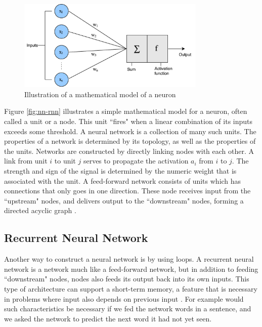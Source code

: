\begin{figure}[ht]
    \centering
    \includegraphics[width=0.8\textwidth]{fig/related_work/nn_perceptron.pdf}
    \caption{Illustration of a mathematical model of a neuron}
    \label{fig:nn-perceptron}
\end{figure}

Figure \ref{fig:nn-rnn} illustrates a simple mathematical model for a neuron, often called a unit or a node. This unit ``fires" when a linear combination of its inputs exceeds some threshold. A neural network is a collection of many such units. The properties of a network is determined by its topology, as well as the properties of the units. Networks are constructed by directly linking nodes with each other. A link from unit \(i\) to unit \(j\) serves to propagate the activation \(a_{i}\) from \(i\) to \(j\). The strength and sign of the signal is determined by the numeric weight that is associated with the unit. A feed-forward network consists of units which has connections that only goes in one direction. These node receives input from the ``upstream" nodes, and delivers output to the ``downstream" nodes, forming a directed acyclic graph \citep{russell2010aimodernapproach}.

\subsection{Recurrent Neural Network}
Another way to construct a neural network is by using loops. A recurrent neural network \citep{rumelhart1988learning} is a network much like a feed-forward network, but in addition to feeding ``downstream" nodes, nodes also feeds its output back into its own inputs. This type of architecture can support a short-term memory, a feature that is necessary in problems where input also depends on previous input \citep{russell2010aimodernapproach}. For example would such characteristics be necessary if we fed the network words in a sentence, and we asked the network to predict the next word it had not yet seen. 

